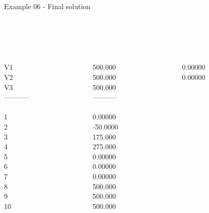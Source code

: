 \begin{frame}{Example 06 - Final solution}

 \\
  \\

\begin{columns}[t]
\begin{column}{0.3\textwidth}
\\
V1\\
V2\\
V3\\
-----------\\
\\
1\\
2\\
3\\
4\\
5\\
6\\
7\\
8\\
9\\
10\\

\end{column}
\begin{column}{0.3\textwidth}
\\
500.000\\
500.000\\
500.000\\
-----------\\
\\
0.00000\\
-50.0000\\
175.000\\
275.000\\
0.00000\\
0.00000\\
0.00000\\
500.000\\
500.000\\
500.000\\
\end{column}  

\begin{column}{0.3\textwidth}
\\
0.00000\\
0.00000\\


\end{column}
\end{columns}
\end{frame}
